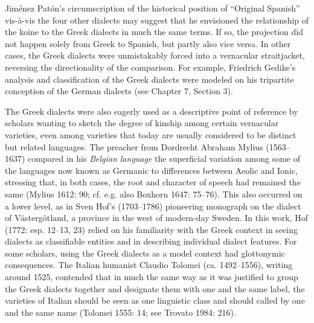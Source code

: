 \documentclass[12pt]{article}
\newenvironment{styleStandard}{\renewcommand\baselinestretch{1.25}\setlength\leftskip{0in}\setlength\rightskip{0in}\setlength\parindent{0.1972in}\setlength\parfillskip{0pt plus 1fil}\setlength\parskip{0in plus 1pt}\writerlistparindent\writerlistleftskip\leavevmode\normalfont\normalsize\writerlistlabel\ignorespaces}{\unskip\vspace{0in plus 1pt}\par}
\newcommand\writerlistleftskip{}
\newcommand\writerlistparindent{}
\newcommand\writerlistlabel{}
\begin{document}
\begin{styleStandard}
Jiménez Patón’s circumscription of the historical position of “Original Spanish” vis-à-vis the four other dialects may suggest that he envisioned the relationship of the koine to the Greek dialects in much the same terms. If so, the projection did not happen solely from Greek to Spanish, but partly also vice versa. In other cases, the Greek dialects were unmistakably forced into a vernacular straitjacket, reversing the directionality of the comparison. For example, Friedrich Gedike’s analysis and classification of the Greek dialects were modeled on his tripartite conception of the German dialects (see Chapter 7, Section 3).
\end{styleStandard}

\begin{styleStandard}
The Greek dialects were also eagerly used as a descriptive point of reference by scholars wanting to sketch the degree of kinship among certain vernacular varieties, even among varieties that today are usually considered to be distinct but related languages. The preacher from Dordrecht Abraham Mylius (1563–1637) compared in his \textit{Belgian language} the superficial variation among some of the languages now known as Germanic to differences between Aeolic and Ionic, stressing that, in both cases, the root and character of speech had remained the same (Mylius 1612: 90; cf. e.g. also Boxhorn 1647: 75–76). This also occurred on a lower level, as in Sven Hof’s (1703–1786) pioneering monograph on the dialect of Västergötland, a province in the west of modern-day Sweden. In this work, Hof (1772: esp. 12–13, 23) relied on his familiarity with the Greek context in seeing dialects as classifiable entities and in describing individual dialect features. For some scholars, using the Greek dialects as a model context had glottonymic consequences. The Italian humanist Claudio Tolomei (ca. 1492–1556), writing around 1525, contended that in much the same way as it was justified to group the Greek dialects together and designate them with one and the same label, the varieties of Italian should be seen as one linguistic class and should called by one and the same name (Tolomei 1555: 14; see Trovato 1984: 216).
\end{styleStandard}
\end{document}
